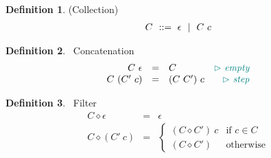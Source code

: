 \documentclass[acmsmall]{acmart}
\theoremstyle{definition}
\newtheorem{definition}{Definition}[section]
\begin{document}
\begin{definition}(Collection)
  \[\begin{array}[t]{r@{}l}
    \nonterm{C} & \is \epsilon \sep C\ c
  \end{array}\]
\end{definition}
\begin{definition}\ Concatenation
  \[\begin{array}{rclr}
    C\ \epsilon 
    &=& 
    C
    & \color{teal} \rhd\ \emph{empty} 
    \\

    C\ (C'\ c) 
    &=& 
    (C\ C')\ c
    & \color{teal} \rhd\ \emph{step} 
    \\
  \end{array}\]
\end{definition}

\begin{definition}\ Filter
  \[\begin{array}{rclr}
    C \diamond \epsilon 
    &=& 
    \epsilon 
    \\

    C \diamond (C'\ c) 
    &=& 
    \begin{cases}
      (C \diamond C')\ c & \text{if } c \in C\\
      (C \diamond C') & \text{otherwise}
    \end{cases}
    \\
  \end{array}\]
\end{definition}



\end{document}
